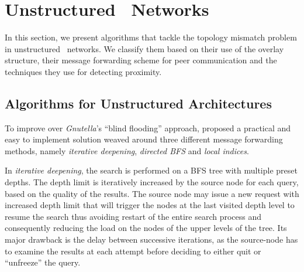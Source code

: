 \section{Unstructured \p\ Networks}
\label{section:unstructured}

In this section, we present algorithms that tackle the topology mismatch
problem in unstructured \p\ networks. We classify them based on their
use of the overlay structure, their message forwarding scheme 
for peer communication and the techniques they use for detecting
proximity.

\subsection{Algorithms for Unstructured Architectures}





To improve over {\sl Gnutella}'s ``blind flooding'' approach,
\cite{YG-M2002} proposed a practical and easy to implement solution 
weaved around three different message forwarding methods, namely
\emph{iterative deepening}, \emph{directed BFS} and \emph{local indices}.

In \emph{iterative deepening}, 
the search is
performed on a BFS tree with multiple preset depths. 
The depth limit is iteratively increased by the source node for each query, 
based on the quality of the results. 
The source node may issue a new request with increased depth limit
that will trigger the nodes at the last visited depth level to resume the
search thus avoiding restart of the entire search process and consequently 
reducing the load on the nodes of the upper levels of the tree. 
Its major drawback is the delay between successive iterations, as the
source-node has to examine the results at each attempt before deciding to
either quit or ``unfreeze'' the query.

